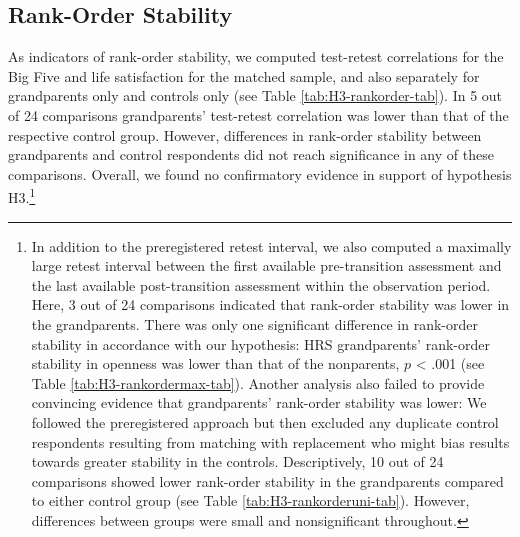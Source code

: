 \documentclass[
  english,
  man,floatsintext]{apa7}
\begin{document}
\hypertarget{rank-order-stability}{%
\subsection{Rank-Order Stability}\label{rank-order-stability}}

As indicators of rank-order stability, we computed test-retest correlations for the Big Five and life satisfaction for the matched sample, and also separately for grandparents only and controls only (see Table \ref{tab:H3-rankorder-tab}). In 5 out of 24 comparisons grandparents' test-retest correlation was lower than that of the respective control group. However, differences in rank-order stability between grandparents and control respondents did not reach significance in any of these comparisons. Overall, we found no confirmatory evidence in support of hypothesis H3.\footnote{In addition to the preregistered retest interval, we also computed a maximally large retest interval between the first available pre-transition assessment and the last available post-transition assessment within the observation period. Here, 3 out of 24 comparisons indicated that rank-order stability was lower in the grandparents. There was only one significant difference in rank-order stability in accordance with our hypothesis: HRS grandparents' rank-order stability in openness was lower than that of the nonparents, \(p\) \textless{} .001 (see Table \ref{tab:H3-rankordermax-tab}). Another analysis also failed to provide convincing evidence that grandparents' rank-order stability was lower: We followed the preregistered approach but then excluded any duplicate control respondents resulting from matching with replacement who might bias results towards greater stability in the controls. Descriptively, 10 out of 24 comparisons showed lower rank-order stability in the grandparents compared to either control group (see Table \ref{tab:H3-rankorderuni-tab}). However, differences between groups were small and nonsignificant throughout.}
\end{document}
